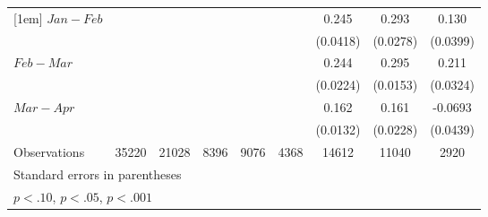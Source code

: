 {\begin{tabular}{l*{8}{c}}
[1em]
 $ Jan-Feb $        &                     &                     &                     &                     &                     &       0.245\sym{**} &       0.293\sym{***}&       0.130\sym{**} \\
                    &                     &                     &                     &                     &                     &    (0.0418)         &    (0.0278)         &    (0.0399)         \\
[1em]
 $ Feb-Mar $        &                     &                     &                     &                     &                     &       0.244\sym{***}&       0.295\sym{***}&       0.211\sym{**} \\
                    &                     &                     &                     &                     &                     &    (0.0224)         &    (0.0153)         &    (0.0324)         \\
[1em]
 $ Mar-Apr $        &                     &                     &                     &                     &                     &       0.162\sym{***}&       0.161\sym{**} &     -0.0693         \\
                    &                     &                     &                     &                     &                     &    (0.0132)         &    (0.0228)         &    (0.0439)         \\
\hline
Observations        &       35220         &       21028         &        8396         &        9076         &        4368         &       14612         &       11040         &        2920         \\
\hline\hline
\multicolumn{9}{l}{\footnotesize Standard errors in parentheses}\\
\multicolumn{9}{l}{\footnotesize \sym{*} \(p<.10\), \sym{**} \(p<.05\), \sym{***} \(p<.001\)}\\
\end{tabular}
}
